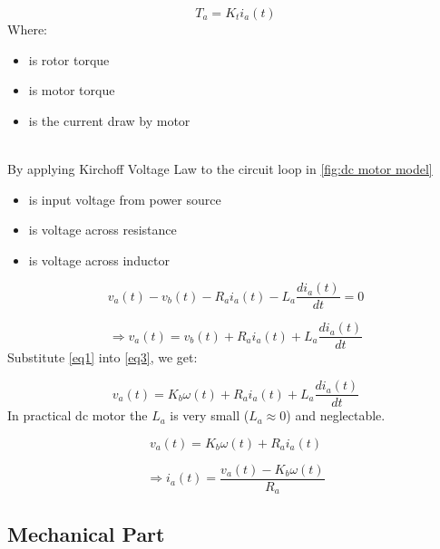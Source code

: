 \documentclass[12pt,a4paper]{article}
\begin{document}
	\begin{equation}
		T_a = K_t i_a(t)
		\label{eq2}
	\end{equation}
	Where:
	\begin{itemize}
		\item { is rotor torque }
		\item { is motor torque}
		\item { is the current draw by motor}
	\end{itemize}
	\hfill\\
	By applying Kirchoff Voltage Law to the circuit loop in \autoref{fig:dc motor model}
	\begin{itemize}
		\item { is input voltage from power source}
		\item { is voltage across resistance}
		\item { is voltage across inductor}
	\end{itemize}
	
	\[v_a(t) - v_b(t) - R_a i_a(t) - L_a \frac{di_a(t)}{dt} = 0\]
	
	\begin{equation}
		\Rightarrow v_a(t) = v_b(t) + R_a i_a(t) + L_a \frac{di_a(t)}{dt}
		\label{eq3}
	\end{equation}
	Substitute \autoref{eq1} into \autoref{eq3}, we get:
	
	\begin{equation}
		v_a(t) = K_b \omega(t) + R_a i_a(t) + L_a \frac{di_a(t)}{dt}
		\label{eq4}
	\end{equation}
	In practical dc motor the \(L_a\) is very small (\(L_a \approx 0\)) and neglectable.
	
	\[v_a(t) = K_b \omega(t) + R_a i_a(t)\]
	
	\begin{equation}
		\Rightarrow \boxed{i_a(t) = \frac{v_a(t) - K_b \omega(t)}{R_a}}
		\label{eq5}
	\end{equation}
	
	\subsection{Mechanical Part}
	
\end{document}
